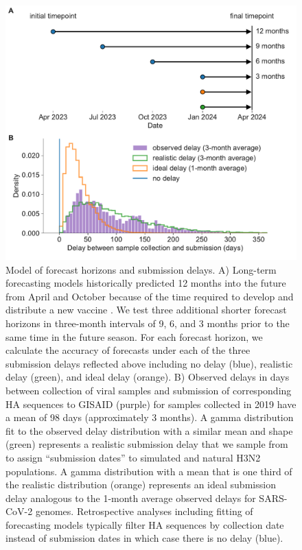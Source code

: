 \documentclass[9pt,lineno]{elife}
\begin{document}
\begin{figure}[htb!]
\includegraphics[width=\linewidth]{figures/distribution_of_delays_and_horizons}
\caption{Model of forecast horizons and submission delays.
  A) Long-term forecasting models historically predicted 12 months into the future from April and October because of the time required to develop and distribute a new vaccine \citep{Luksza:2014hj}.
  We test three additional shorter forecast horizons in three-month intervals of 9, 6, and 3 months prior to the same time in the future season.
  For each forecast horizon, we calculate the accuracy of forecasts under each of the three submission delays reflected above including no delay (blue), realistic delay (green), and ideal delay (orange).
  B) Observed delays in days between collection of viral samples and submission of corresponding HA sequences to GISAID (purple) for samples collected in 2019 have a mean of 98 days (approximately 3 months).
  A gamma distribution fit to the observed delay distribution with a similar mean and shape (green) represents a realistic submission delay that we sample from to assign ``submission dates'' to simulated and natural H3N2 populations.
  A gamma distribution with a mean that is one third of the realistic distribution (orange) represents an ideal submission delay analogous to the 1-month average observed delays for SARS-CoV-2 genomes.
  Retrospective analyses including fitting of forecasting models typically filter HA sequences by collection date instead of submission dates in which case there is no delay (blue).
}
\end{figure}
\end{document}
